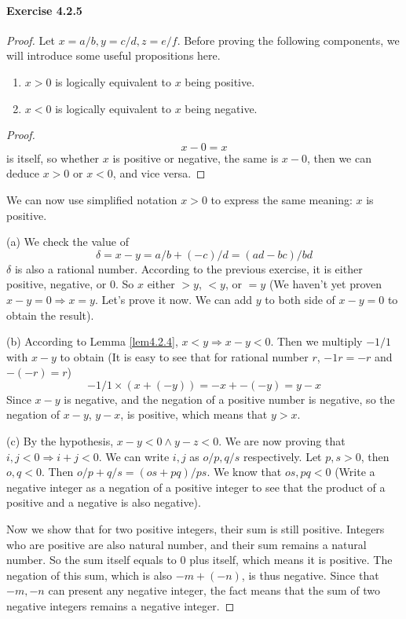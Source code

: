 \paragraph{Exercise 4.2.5} \label{exercise4.2.5}
\begin{proof}
Let $x=a/b,y=c/d,z=e/f$. Before proving the following components, we will introduce some useful 
propositions here.
\begin{lem} \label{lem4.2.4}
\begin{enumerate}
\item $x>0$ is logically equivalent to $x$ being positive.
\item $x<0$ is logically equivalent to $x$ being negative.
\end{enumerate}
\end{lem}
\begin{proof}
\[
x-0 =x
\]
is itself, so whether $x$ is positive or negative, the same is $x-0$, then we can deduce $x>0$ or $x<0$, 
and vice versa.
\end{proof}

We can now use simplified notation $x>0$ to express the same meaning: $x$ is positive. 

(a)
We check the value of 
\[
\delta = x-y = a/b +(-c)/d = (ad-bc)/bd
\]
$\delta$ is also a rational number. According to the previous exercise, it is either positive, negative, 
or $0$. So $x$ either $>y$, $<y$, or $=y$ (We haven't yet proven $x-y=0 \Longrightarrow x = y$. Let's 
prove it now. We can add $y$ to both side of $x-y=0$ to obtain the result).

(b)
According to Lemma \ref{lem4.2.4}, $x<y \Longrightarrow x-y<0$. Then we multiply $-1/1$ with $x-y$ to 
obtain (It is easy to see that for rational number $r$, $-1r = -r$ and $-(-r)=r$)
\[
-1/1 \times (x + (-y)) = -x + -(-y) = y - x
\]
Since $x-y$ is negative, and the negation of a positive number is negative, so the negation of $x-y$, 
$y-x$, is positive, which means that $y>x$.

(c)
By the hypothesis, $x-y<0 \wedge y-z<0$. We are now proving that $i,j<0 \Longrightarrow i + j <0$. We can 
write $i,j$ as $o/p,q/s$ respectively. Let $p,s>0$, then $o,q<0$. Then $o/p+q/s = (os+pq)/ps$. We know 
that $os,pq<0$ (Write a negative integer as a negation of a positive integer to see that the product of a 
positive and a negative is also negative). 

Now we show that for two positive integers, their sum is still 
positive. Integers who are positive are also natural number, and their sum remains a natural number. So 
the sum itself equals to $0$ plus itself, which means it is positive. The negation of this sum, which is 
also $-m+(-n)$, is thus negative. Since that $-m,-n$ can present any negative integer, the fact means that 
the sum of two negative integers remains a negative integer.


\end{proof}

